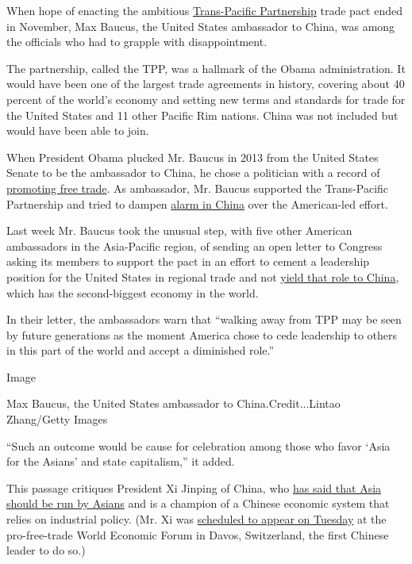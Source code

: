 When hope of enacting the ambitious
\href{http://www.nytimes3xbfgragh.onion/interactive/2016/business/tpp-explained-what-is-trans-pacific-partnership.html}{Trans-Pacific
Partnership} trade pact ended in November, Max Baucus, the United States
ambassador to China, was among the officials who had to grapple with
disappointment.

The partnership, called the TPP, was a hallmark of the Obama
administration. It would have been one of the largest trade agreements
in history, covering about 40 percent of the world's economy and setting
new terms and standards for trade for the United States and 11 other
Pacific Rim nations. China was not included but would have been able to
join.

When President Obama plucked Mr. Baucus in 2013 from the United States
Senate to be the ambassador to China, he chose a politician with a
record of
\href{https://sinosphere.blogs.nytimes3xbfgragh.onion/2013/12/18/obamas-choice-for-china-envoy-a-longtime-free-trade-advocate/}{promoting
free trade}. As ambassador, Mr. Baucus supported the Trans-Pacific
Partnership and tried to dampen
\href{https://www.nytimes3xbfgragh.onion/2015/05/13/us/politics/as-obama-plays-china-card-on-trade-chinese-pursue-their-own-deals.html}{alarm
in China} over the American-led effort.

Last week Mr. Baucus took the unusual step, with five other American
ambassadors in the Asia-Pacific region, of sending an open letter to
Congress asking its members to support the pact in an effort to cement a
leadership position for the United States in regional trade and not
\href{https://www.nytimes3xbfgragh.onion/2016/11/20/business/international/apec-trade-china-obama-trump-tpp-trans-pacific-partnership.html}{yield
that role to China}, which has the second-biggest economy in the world.

In their letter, the ambassadors warn that ``walking away from TPP may
be seen by future generations as the moment America chose to cede
leadership to others in this part of the world and accept a diminished
role.''

Image

Max Baucus, the United States ambassador to China.Credit...Lintao
Zhang/Getty Images

``Such an outcome would be cause for celebration among those who favor
`Asia for the Asians' and state capitalism,'' it added.

This passage critiques President Xi Jinping of China, who
\href{http://www.globaltimes.cn/content/861573.shtml}{has said that Asia
should be run by Asians} and is a champion of a Chinese economic system
that relies on industrial policy. (Mr. Xi was
\href{https://www.nytimes3xbfgragh.onion/2017/01/10/world/asia/davos-china-xi-jinping-trump.html}{scheduled
to appear on Tuesday} at the pro-free-trade World Economic Forum in
Davos, Switzerland, the first Chinese leader to do so.)

